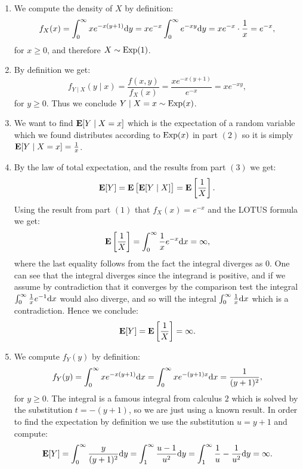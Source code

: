 \documentclass[11pt,a4paper]{article}
\begin{document}
\begin{solution} \phantom{}
  \begin{enumerate}
    \item[(1)] We compute the density of $X$ by definition:
      \[
        f_X(x) =
        \int_{0}^{\infty} x e^{-x (y + 1)} \dy =
        x e^{-x} \int_{0}^{\infty} e^{-xy} \dy =
        x e^{-x} \cdot \frac{1}{x} =
        e^{-x},
      \]
      for $x \geq 0$, and therefore $X \sim \operatorname{Exp}(1)$.
    \item[(2)] By definition we get:
      \[
        f_{Y \mid X}(y \mid x) =
        \frac{f(x,y)}{f_X(x)} =
        \frac{x e^{-x(y + 1)}}{e^{-x}} =
        x e^{-xy},
      \]
      for $y \geq 0$. 
      Thus we conclude $Y \mid X = x \sim \operatorname{Exp}(x)$.
    \item[(3)] We want to find $\mathbf{E}[Y \mid X = x]$
      which is the expectation of a random variable which we found
      distributes according to $\operatorname{Exp}(x)$ in part $(2)$
      so it is simply $\mathbf{E}[Y \mid X = x] = \frac{1}{x}$.
    \item[(4)] By the law of total expectation,
      and the results from part $(3)$ we get:
      \[
        \mathbf{E}[Y] =
        \mathbf{E}\left[\mathbf{E}[Y \mid X]\right] =
        \mathbf{E}\left[\frac{1}{X}\right].
      \]
      Using the result from part $(1)$ that $f_X(x) = e^{-x}$
      and the LOTUS formula we get:
      \[
        \E\left[\frac{1}{X}\right] =
        \int_{0}^{\infty} \frac{1}{x} e^{-x} \dx = \infty,
      \]
      where the last equality follows from the fact the integral diverges
      as $0$.
      One can see that the integral diverges since the integrand is positive,
      and if we assume by contradiction that it converges by the comparison
      test the integral $\int_{0}^{\infty} \frac{1}{x} e^{-1} \dx$ would
      also diverge, and so will the integral 
      $\int_{0}^{\infty} \frac{1}{x} \dx$ which is a contradiction.
      Hence we conclude:
      \[
        \mathbf{E}[Y] =
        \mathbf{E}\left[\frac{1}{X}\right] = \infty.
      \]
    \item[(5)] We compute $f_Y(y)$ by definition:
      \[
        f_Y(y) =
        \int_{0}^{\infty} x e^{-x(y+1)} \dx =
        \int_{0}^{\infty} x e^{-(y+1)x} \dx =
        \frac{1}{(y + 1)^2},
      \]
      for $y \geq 0$.
      The integral is a famous integral from calculus $2$
      which is solved by the substitution $t = -(y+1)$,
      so we are just using a known result.
      In order to find the expectation by definition we use
      the substitution $u = y + 1$ and compute:
      \[
        \E[Y] =
        \int_{0}^{\infty} \frac{y}{(y + 1)^2} \dy =
        \int_{1}^{\infty} \frac{u - 1}{u^2} \dy =
        \int_{1}^{\infty} \frac{1}{u} - \frac{1}{u^2} \dy = \infty.
      \]
  \end{enumerate}
\end{solution}
\end{document}
